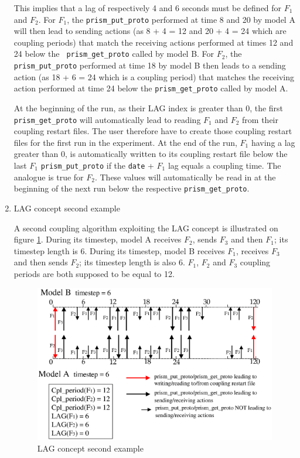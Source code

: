 \begin{enumerate}
  This implies that a lag of respectively 4 and 6 seconds must be
  defined for $F_1$ and $F_2$. For $F_1$, the {\tt prism\_put\_proto}
  performed at time 8 and 20 by model A will then lead to sending actions
  (as 8 + 4 = 12 and 20 + 4 = 24 which are coupling periods) that
  match the receiving actions performed at times 12 and 24 below the {\tt
  prism\_get\_proto} called by model B.  For $F_2$, the {\tt
  prism\_put\_proto} performed at time 18 by model B then leads to
  a sending action (as 18 + 6 = 24 which is a coupling
  period) that matches the receiving action performed at time 24
  below the {\tt prism\_get\_proto} called by model A.

  At the beginning of the run, as their LAG index is greater than 0,
  the first {\tt prism\_get\_proto} will automatically lead to reading
  $F_1$ and $F_2$ from their coupling restart files. The user
  therefore have to create those coupling restart files for the first
  run in the experiment. At the end of the run, $F_1$
  having a lag greater than 0, is automatically written to its
  coupling restart file below the last $F_1$ {\tt prism\_put\_proto} if the
  {\tt date} + $F_1$ lag equals a coupling time. The analogue is true
  for $F_2$. These
  values will automatically be read in at the beginning of the next
  run below the respective {\tt prism\_get\_proto}.

  \item LAG concept second example

  A second coupling algorithm exploiting the LAG concept is
  illustrated on figure \ref{fig:lag_concept_2}. During its timestep,
  model A receives $F_2$, sends $F_3$ and then $F_1$; its timestep
  length is 6. During its timestep, model B receives $F_1$, receives
  $F_3$ and then sends $F_2$; its timestep length is also 6.  $F_1$,
  $F_2$ and $F_3$ coupling periods are both supposed to be equal to
  12.
 
\begin{figure}
\includegraphics[scale=.6]{fig_lag_concept_2.eps} 
\caption{LAG concept second example} 
\label{fig:lag_concept_2}
\end{figure}


\end{enumerate}

